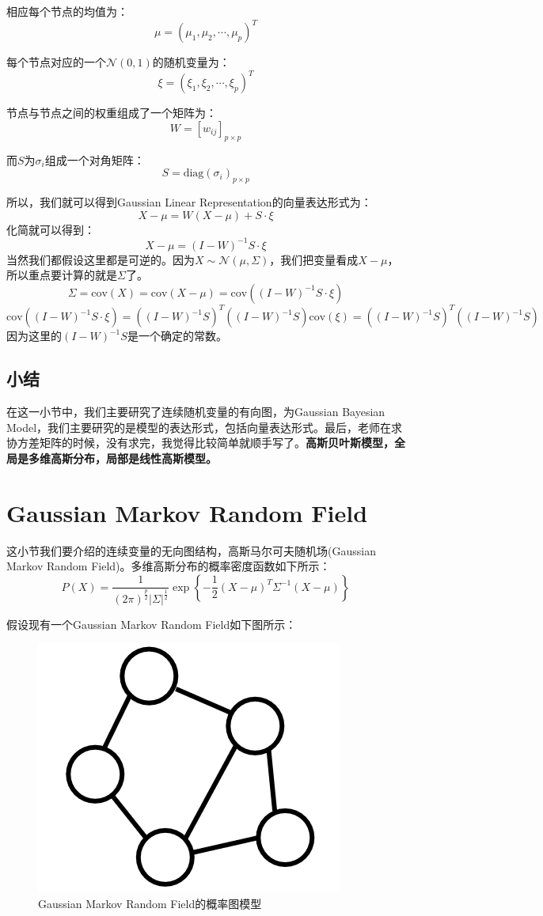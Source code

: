 \documentclass[a4paper]{article}
\begin{document}
相应每个节点的均值为：
$$
\mu=(\mu_1,\mu_2,\cdots,\mu_p)^T
$$

每个节点对应的一个$\mathcal{N}(0,1)$的随机变量为：
$$
\xi=(\xi_1,\xi_2,\cdots,\xi_p)^T
$$

节点与节点之间的权重组成了一个矩阵为：
$$
W = [w_{ij}]_{p\times p}
$$

而$S$为$\sigma_{i}$组成一个对角矩阵：
$$
S = \mathrm{diag}(\sigma_i)_{p \times p}
$$

所以，我们就可以得到Gaussian Linear Representation的向量表达形式为：
\begin{equation}
    X-\mu = W(X-\mu) + S\cdot \xi
\end{equation}
化简就可以得到：
\begin{equation}
    X - \mu = (I-W)^{-1} S\cdot \xi
\end{equation}
当然我们都假设这里都是可逆的。因为$X\sim \mathcal{N}(\mu,\Sigma)$，我们把变量看成$X-\mu$，所以重点要计算的就是$\Sigma$了。
$$
\Sigma = \mathrm{cov}(X) = \mathrm{cov}(X-\mu) = \mathrm{cov}((I-W)^{-1} S\cdot \xi) 
$$
$$
\mathrm{cov}((I-W)^{-1} S\cdot \xi) = ((I-W)^{-1} S)^T((I-W)^{-1} S)\mathrm{cov}(\xi) = ((I-W)^{-1} S)^T((I-W)^{-1} S)
$$
因为这里的$(I-W)^{-1} S$是一个确定的常数。

\subsection{小结}
在这一小节中，我们主要研究了连续随机变量的有向图，为Gaussian Bayesian Model，我们主要研究的是模型的表达形式，包括向量表达形式。最后，老师在求协方差矩阵的时候，没有求完，我觉得比较简单就顺手写了。\textbf{高斯贝叶斯模型，全局是多维高斯分布，局部是线性高斯模型。}

\section{Gaussian Markov Random Field}
这小节我们要介绍的连续变量的无向图结构，高斯马尔可夫随机场(Gaussian Markov Random Field)。多维高斯分布的概率密度函数如下所示：
\begin{equation}
    P(X) = \frac{1}{(2\pi)^{\frac{p}{2}}|\Sigma|^{\frac{1}{2}}} \exp \left\{ -\frac{1}{2} (X-\mu)^T\Sigma^{-1}(X-\mu) \right\}
\end{equation}

假设现有一个Gaussian Markov Random Field如下图所示：
\begin{figure}[H]
    \centering
    \includegraphics[width=.28\textwidth]{微信图片_20200226224151.png}
    \caption{Gaussian Markov Random Field的概率图模型}
    \label{fig:my_label_1}
\end{figure}
\end{document}

